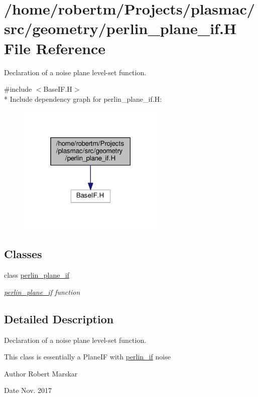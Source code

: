 \hypertarget{perlin__plane__if_8H}{}\section{/home/robertm/\+Projects/plasmac/src/geometry/perlin\+\_\+plane\+\_\+if.H File Reference}
\label{perlin__plane__if_8H}


Declaration of a noise plane level-\/set function.  


{\ttfamily \#include $<$Base\+I\+F.\+H$>$}\\*
Include dependency graph for perlin\+\_\+plane\+\_\+if.\+H\+:\nopagebreak
\begin{figure}[H]
\begin{center}
\leavevmode
\includegraphics[width=199pt]{perlin__plane__if_8H__incl}
\end{center}
\end{figure}
\subsection*{Classes}
\begin{DoxyCompactItemize}
\item 
class \hyperlink{classperlin__plane__if}{perlin\+\_\+plane\+\_\+if}
\begin{DoxyCompactList}\small\item\em \hyperlink{classperlin__plane__if}{perlin\+\_\+plane\+\_\+if} function \end{DoxyCompactList}\end{DoxyCompactItemize}


\subsection{Detailed Description}
Declaration of a noise plane level-\/set function. 

This class is essentially a Plane\+IF with \hyperlink{classperlin__if}{perlin\+\_\+if} noise \begin{DoxyAuthor}{Author}
Robert Marskar 
\end{DoxyAuthor}
\begin{DoxyDate}{Date}
Nov. 2017 
\end{DoxyDate}
